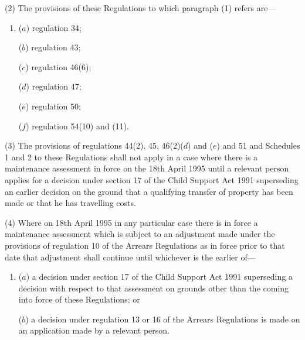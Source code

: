 \documentclass[12pt,a4paper]{article}
\begin{document}
(2) The provisions of these Regulations to which paragraph (1) refers are—
\begin{enumerate}\item[]
($a$) regulation 34;

($b$) regulation 43;

($c$) regulation 46(6);

($d$) regulation 47;

($e$) regulation 50;

($f$) regulation 54(10) and (11).

\end{enumerate}

(3) The provisions of regulations 44(2), 45, 46(2)($d$) and ($e$) and 51 and Schedules 1 and 2 to these Regulations shall not apply in a case where there is a maintenance assessment in force on the 18th April 1995 until 
a relevant person applies for a decision under section 17 of the Child Support Act 1991 superseding an earlier decision on the ground that a qualifying transfer of property has been made or that he has travelling costs.  %

(4) Where on 18th April 1995 in any particular case there is in force a maintenance assessment which is subject to an adjustment made under the provisions of regulation 10 of the Arrears Regulations as in force prior to that date that adjustment shall continue until whichever is the earlier of—
\begin{enumerate}\item[]
($a$) 
a decision under section 17 of the Child Support Act 1991 superseding a decision with respect to  %
that assessment on grounds other than the coming into force of these Regulations; or


($b$) a decision under regulation 13 or 16 of the Arrears Regulations is made on an application made by a relevant person.
\end{enumerate}
\end{document}
